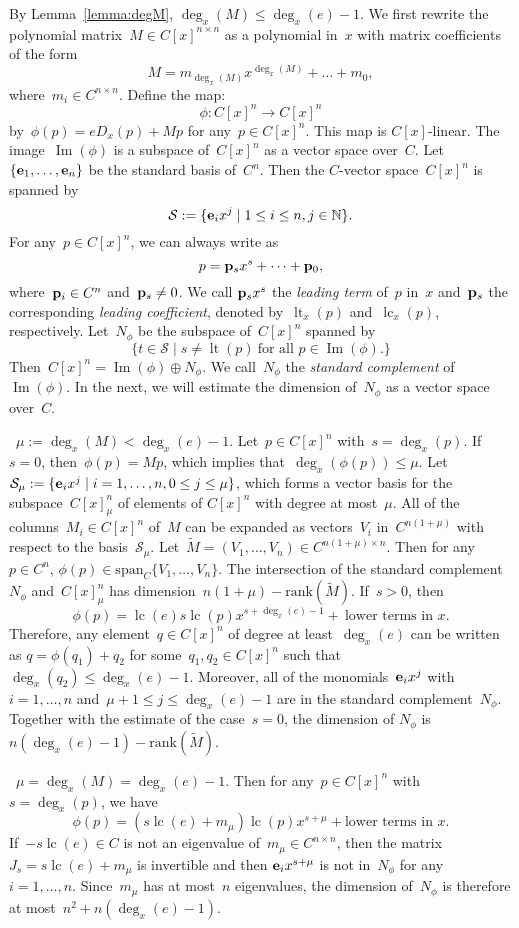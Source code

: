 \documentclass{sig-alternate}
\newcommand{\bN}{ {\mathbb N}}
\newcommand{\cS}{ {\mathcal S}}
\newcommand{\ve} {{\bf e}}
\newcommand{\vp} {{\bf p}}
\def\lc{\operatorname{lc}}
\def\lt{\operatorname{lt}}
\def\im{\operatorname{Im}}
\begin{document}
By Lemma~\ref{lemma:degM}, $\deg_x(M)\leq \deg_x(e)-1$.
We first rewrite the polynomial matrix~$M\in C[x]^{n\times n}$ as a polynomial in~$x$
with matrix coefficients of the form
\[M = m_{\deg_x(M)}x^{\deg_x(M)} + \ldots + m_0, \]
where~$m_i\in C^{n\times n}$. Define the map:
\[\phi: C[x]^n \rightarrow C[x]^n\]
by~$\phi(p)= eD_x(p) + Mp$ for any~$p\in C[x]^n$. This map is $C[x]$-linear.
The image~$\im(\phi)$ is a subspace of~$C[x]^n$ as a vector space over~$C$.
Let~$\{\ve_1, \ldots, \ve_n\}$ be the standard basis of~$C^n$. Then the $C$-vector space~$C[x]^n$
is spanned by
\[\cS := \{\ve_ix^j \mid 1\leq i \leq n, j\in \bN\}.\]
For any~$p \in C[x]^n$, we can always write as
\[p = \vp_sx^s + \cdots + \vp_0,\]
where~$\vp_i\in C^n$ and~$\vp_s \neq 0$. We call $\vp_sx^s$
the \emph{leading term} of~$p$ in~$x$ and~$\vp_s$ the corresponding \emph{leading coefficient},
denoted by~$\lt_x(p)$ and~$\lc_x(p)$, respectively.
Let~$N_\phi$ be the subspace of~$C[x]^n$ spanned by
\[\{t \in \cS \mid s\neq \lt(p) ~\text{for all~$p\in \im(\phi)$}. \}\]
Then~$C[x]^n = \im(\phi) \oplus N_\phi$. We call~$N_{\phi}$ the \emph{standard complement} of~$\im(\phi)$.
In the next, we will estimate the dimension of~$N_\phi$ as a vector space over~$C$.


~$\mu := \deg_x(M)<\deg_x(e)-1$. Let~$p\in C[x]^n$ with~$s=\deg_x(p)$.
If~$s=0$, then~$\phi(p) = Mp$, which implies that~$\deg_x(\phi(p))\leq \mu$.
Let~$\cS_\mu := \{\ve_i x^j \mid i=1, \ldots, n, 0\leq j\leq \mu\}$, which forms a vector basis
for the subspace~$C[x]_\mu^n$ of elements of $C[x]^n$ with degree at most~$\mu$. All of the columns~$M_i\in C[x]^n$ of~$M$
can be expanded as vectors~$V_i$ in~$C^{n(1+\mu)}$ with respect to the basis~$\cS_\mu$. Let~$\tilde{M} = (V_1, \ldots, V_n)\in C^{n(1+\mu) \times n}$.
Then for any~$p\in C^n$, $\phi(p) \in \text{span}_C\{V_1, \ldots, V_n\}$. The intersection of the standard complement~$N_\phi$
and~$C[x]_\mu^n$ has dimension~$n(1+\mu)-\text{rank}(\tilde{M})$. If~$s>0$, then
\[\phi(p)=\lc(e)s\lc(p)x^{s+\deg_x(e)-1} +~ \text{lower terms in~$x$}.\]
Therefore, any element~$q\in C[x]^n$ of degree at least~$\deg_x(e)$ can be written as
$q = \phi(q_1) + q_2$ for some~$q_1, q_2\in C[x]^n$ such that~$\deg_x(q_2)\leq \deg_x(e)-1$.
Moreover, all of the monomials~$\ve_ix^j$ with~$i=1, \ldots, n$ and~$\mu+1\leq j\leq \deg_x(e)-1$
are in the standard complement~$N_\phi$. Together with the estimate of the case~$s=0$, the dimension of
$N_\phi$ is $n(\deg_x(e)-1)-\text{rank}(\tilde{M})$.


~$\mu =\deg_x(M)=\deg_x(e)-1$. Then for any~$p\in C[x]^n$ with~$s=\deg_x(p)$, we have
\[\phi(p) = (s\lc(e) + m_{\mu})\lc(p)x^{s+\mu}+\text{lower terms in~$x$}.\]
If~$-s\lc(e)\in C$ is not an eigenvalue of~$m_{\mu}\in C^{n\times n}$, then
the matrix~$J_s = s\lc(e) + m_{\mu}$ is invertible and then $\ve_ix^{s+\mu}$ is not in~$N_\phi$
for any~$i=1, \ldots, n$. Since~$m_\mu$ has at most~$n$ eigenvalues, the dimension of~$N_\phi$
is therefore at most~$n^2+n(\deg_x(e)-1)$.
\end{document}
